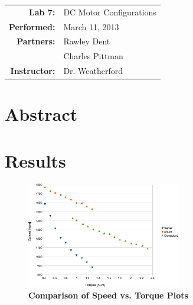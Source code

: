 \documentclass{article}
\begin{document}
\begin{tabular}{rl}
  \textbf{Lab 7:} & DC Motor Configurations \\
  \textbf{Performed:} & March 11, 2013 \\
  \textbf{Partners:} & Rawley Dent \\ & Charles Pittman \\
  \textbf{Instructor:} & Dr. Weatherford
\end{tabular}


\section*{Abstract}


\section*{Results}

\begin{figure}[H]
  \centering
    \includegraphics[width=0.6\textwidth]{img/graph}
    \caption{\textbf{Comparison of Speed vs. Torque Plots}}
    \label{fig:graph}
\end{figure}
\end{document}
